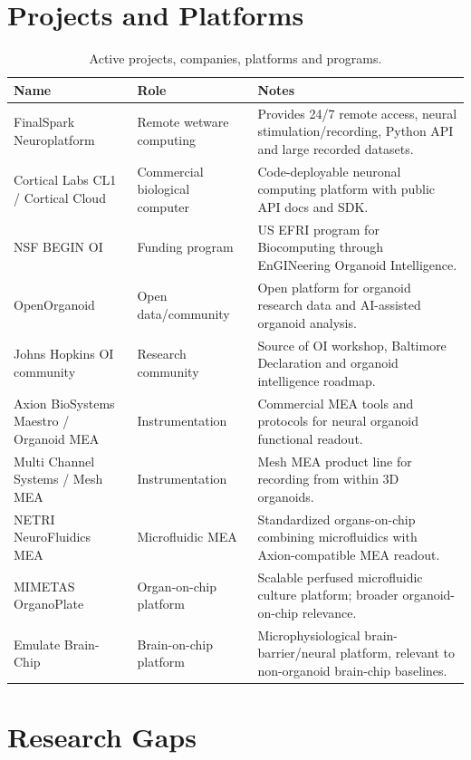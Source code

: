 \documentclass[10pt,twocolumn]{article}
\begin{document}
\section{Projects and Platforms}

\begin{table}[t]
\small
\caption{Active projects, companies, platforms and programs.}
\begin{tabularx}{\textwidth}{p{}p{}X}
\toprule
\textbf{Name} & \textbf{Role} & \textbf{Notes} \\
\midrule
FinalSpark Neuroplatform & Remote wetware computing & Provides 24/7 remote access, neural stimulation/recording, Python API and large recorded datasets. \\
Cortical Labs CL1 / Cortical Cloud & Commercial biological computer & Code-deployable neuronal computing platform with public API docs and SDK. \\
NSF BEGIN OI & Funding program & US EFRI program for Biocomputing through EnGINeering Organoid Intelligence. \\
OpenOrganoid & Open data/community & Open platform for organoid research data and AI-assisted organoid analysis. \\
Johns Hopkins OI community & Research community & Source of OI workshop, Baltimore Declaration and organoid intelligence roadmap. \\
Axion BioSystems Maestro / Organoid MEA & Instrumentation & Commercial MEA tools and protocols for neural organoid functional readout. \\
Multi Channel Systems / Mesh MEA & Instrumentation & Mesh MEA product line for recording from within 3D organoids. \\
NETRI NeuroFluidics MEA & Microfluidic MEA & Standardized organs-on-chip combining microfluidics with Axion-compatible MEA readout. \\
MIMETAS OrganoPlate & Organ-on-chip platform & Scalable perfused microfluidic culture platform; broader organoid-on-chip relevance. \\
Emulate Brain-Chip & Brain-on-chip platform & Microphysiological brain-barrier/neural platform, relevant to non-organoid brain-chip baselines. \\
\bottomrule
\end{tabularx}
\end{table}

\section{Research Gaps}
\end{document}
